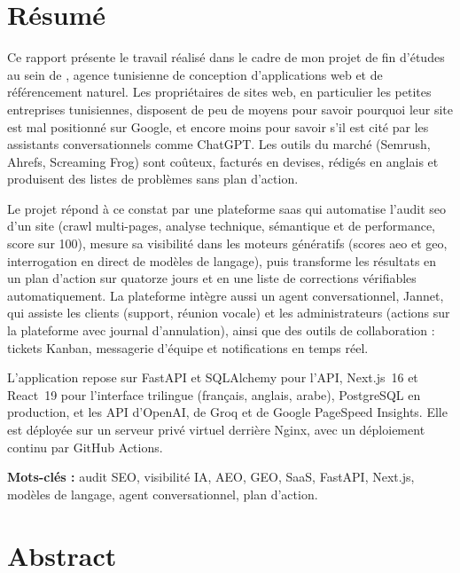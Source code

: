 \chapter*{Résumé}

Ce rapport présente le travail réalisé dans le cadre de mon projet de fin d'études au sein de \organisme, agence tunisienne de conception d'applications web et de référencement naturel. Les propriétaires de sites web, en particulier les petites entreprises tunisiennes, disposent de peu de moyens pour savoir pourquoi leur site est mal positionné sur Google, et encore moins pour savoir s'il est cité par les assistants conversationnels comme ChatGPT. Les outils du marché (Semrush, Ahrefs, Screaming Frog) sont coûteux, facturés en devises, rédigés en anglais et produisent des listes de problèmes sans plan d'action.

Le projet \xapp{} répond à ce constat par une plateforme \gls{saas} qui automatise l'audit \gls{seo} d'un site (crawl multi-pages, analyse technique, sémantique et de performance, score sur 100), mesure sa visibilité dans les moteurs génératifs (scores \gls{aeo} et \gls{geo}, interrogation en direct de modèles de langage), puis transforme les résultats en un plan d'action sur quatorze jours et en une liste de corrections vérifiables automatiquement. La plateforme intègre aussi un agent conversationnel, Jannet, qui assiste les clients (support, réunion vocale) et les administrateurs (actions sur la plateforme avec journal d'annulation), ainsi que des outils de collaboration : tickets Kanban, messagerie d'équipe et notifications en temps réel.

L'application repose sur FastAPI et SQLAlchemy pour l'API, Next.js~16 et React~19 pour l'interface trilingue (français, anglais, arabe), PostgreSQL en production, et les API d'OpenAI, de Groq et de Google PageSpeed Insights. Elle est déployée sur un serveur privé virtuel derrière Nginx, avec un déploiement continu par GitHub Actions. 

\medskip
\noindent\textbf{Mots-clés :} audit SEO, visibilité IA, AEO, GEO, SaaS, FastAPI, Next.js, modèles de langage, agent conversationnel, plan d'action.

\vspace{1.5cm}
\chapter*{Abstract}

